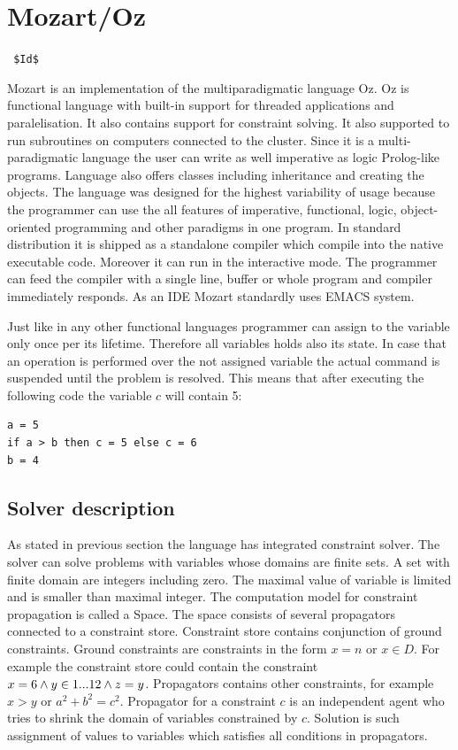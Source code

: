 \section{Mozart/Oz}
\verb= $Id$ =

Mozart is an implementation of the multiparadigmatic language Oz. Oz is functional
language with built-in support for threaded applications and paralelisation. It also
contains support for constraint solving. It also supported to run subroutines on computers
connected to the cluster. Since it is a multi-paradigmatic language the user
can write as well imperative as logic Prolog-like programs. Language also offers classes
including inheritance and creating the objects. The language was designed for the
highest variability of usage because the programmer can use the all features of imperative,
functional, logic, object-oriented programming and other paradigms in one program. In standard distribution
it is shipped as a standalone compiler which compile into the native executable code.
Moreover it can run in the interactive mode. The programmer can feed the compiler with
a single line, buffer or whole program and compiler immediately responds. As an IDE
Mozart standardly uses EMACS system.

Just like in any other functional languages programmer can assign to the variable 
only once per its lifetime. Therefore all variables holds also its state. In case that
an operation is performed over the not assigned variable the actual command is suspended
until the problem is resolved. This means that after executing the following code the
variable $c$ will contain 5:

\begin{verbatim}
a = 5
if a > b then c = 5 else c = 6
b = 4
\end{verbatim}

\subsection{Solver description}
As stated in previous section the language has integrated constraint solver. The solver
can solve problems with variables whose domains are finite sets. A set with finite domain
are integers including zero. The maximal value of variable is limited and is smaller 
than maximal integer. The computation model for constraint propagation is called 
a Space. The space consists of several propagators connected to a constraint store.
Constraint store contains conjunction of ground constraints. Ground constraints
are constraints in the form $x=n$ or $x \in D$. For example the constraint store could
contain the constraint $x = 6 \wedge y \in 1 ... 12 \wedge z = y$. Propagators contains
other constraints, for example $x>y$ or $a^2 + b^2 = c^2$. Propagator for a constraint
 $c$ is an independent agent who tries to shrink the domain of variables constrained
 by $c$. Solution is such assignment of values to variables which satisfies all conditions
 in propagators.
 
